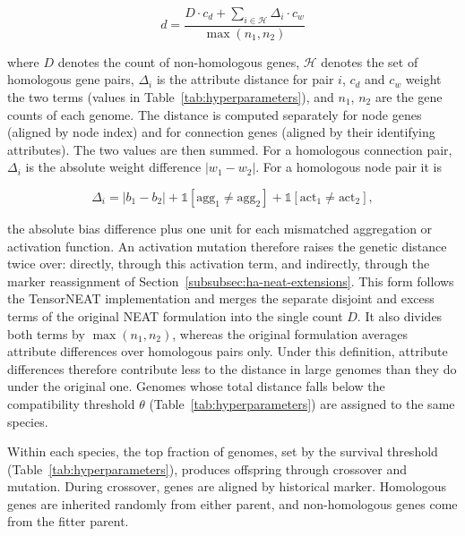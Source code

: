 \documentclass[12pt]{article}
\newcommand{\revClarity}[2]{#2}
\newcommand{\revNota}[2]{#2}
\begin{document}
\[d = \frac{D \cdot c_d + \sum_{i \in \mathcal{H}} \Delta_i \cdot c_w}{\max(n_1, n_2)}\]

where $D$ denotes the count of non-homologous genes, \revNota{N-02}{$\mathcal{H}$ denotes the set of homologous gene pairs}, \revNota{N-03}{$\Delta_i$ is the attribute distance for pair $i$}, \revNota{N-01}{$c_d$ and $c_w$ weight the two terms} (values in Table~\ref{tab:hyperparameters}), and $n_1$, $n_2$ are the gene counts of each genome.
\revClarity{L-02}{The distance is computed separately for node genes (aligned by node index) and for connection genes (aligned by their identifying attributes). The two values are then summed.}
For a homologous connection pair, $\Delta_i$ is the absolute weight difference $|w_1 - w_2|$.
For a homologous node pair it is

\[\Delta_i = |b_1 - b_2| + \mathbb{1}[\text{agg}_1 \neq \text{agg}_2] + \mathbb{1}[\text{act}_1 \neq \text{act}_2],\]

the absolute bias difference plus one unit for each mismatched aggregation or activation function.
An activation mutation therefore raises the genetic distance twice over: directly, through this activation term, and indirectly, through the marker reassignment of Section~\ref{subsubsec:ha-neat-extensions}.
This form follows the TensorNEAT \parencite{wang_tensorized_2024} implementation and merges the separate disjoint and excess terms of the original NEAT formulation into the single count $D$.
It also divides both terms by $\max(n_1, n_2)$, whereas the original formulation averages attribute differences over homologous pairs only. \revClarity{L-05}{Under this definition, attribute differences therefore contribute less to the distance in large genomes than they do under the original one.}
Genomes whose total distance falls below the compatibility threshold $\theta$ (Table~\ref{tab:hyperparameters}) are assigned to the same species.

Within each species, the top fraction of genomes, set by the survival threshold (Table~\ref{tab:hyperparameters}), produces offspring through crossover and mutation.
During crossover, genes are aligned by historical marker. Homologous genes are inherited randomly from either parent, and non-homologous genes come from the fitter parent.

\end{document}
